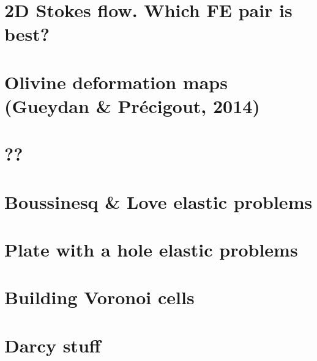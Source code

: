 \documentclass[a4paper,11pt]{report}
\begin{document}
\chapter{2D Stokes flow. Which FE pair is best? \label{f120}} %

\chapter{Olivine deformation maps (Gueydan \& Pr{\'e}cigout, 2014)  \label{f121}} %

\chapter{??\label{f122}} %

\chapter{Boussinesq \& Love elastic problems\label{f123}} %

\chapter{Plate with a hole elastic problems \label{f124}} %

\chapter{Building Voronoi cells \label{f125}} %

\chapter{Darcy stuff\label{f126}} %
\end{document}
